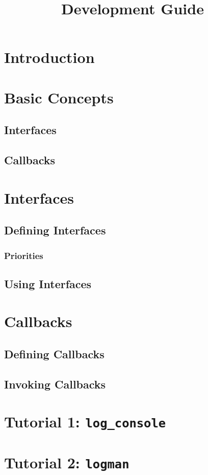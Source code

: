 \documentclass{article}
\title{\asss{} Development Guide}
\begin{document}
\maketitle

\section{Introduction}


\section{Basic Concepts}

\subsection{Interfaces}

\subsection{Callbacks}


\section{Interfaces}

\subsection{Defining Interfaces}

\subsubsection{Priorities}



\subsection{Using Interfaces}


\section{Callbacks}

\subsection{Defining Callbacks}

\subsection{Invoking Callbacks}


\section{Tutorial 1: \texttt{log\_console}}

\section{Tutorial 2: \texttt{logman}}
\end{document}
